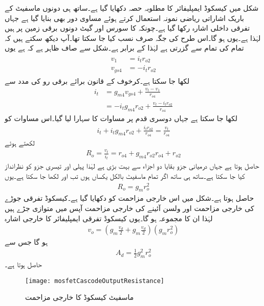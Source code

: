 شکل  میں کیسکوڈ ایمپلیفائر کا مطلوبہ حصہ دکھایا گیا ہے۔ساتھ ہی دونوں ماسفیٹ کے باریک اشاراتی ریاضی نمونہ استعمال کرتے ہوئے مساوی دور بھی بنایا گیا ہے جہاں تفرقی داخلی اشارہ  رکھا گیا ہے۔چونکہ  کا سورس اور گیٹ دونوں برقی زمین پر ہیں لہٰذا  ہے۔یوں  ہو گا۔اس طرح  کی جگہ صرف  نسب کیا جا سکتا تھا۔آپ دیکھ سکتے ہیں کہ  تمام کی تمام  سے گزرتی ہے لہٰذا  کے برابر ہے۔شکل سے صاف ظاہر ہے کہ  ہے یوں
\begin{gather}
\begin{aligned}\label{مساوات_تفرقی_ماسفیٹ_کیسکوڈ_خارجی_مزاحمت}
v_1&=i_t r_{o2}\\
v_{gs4}&=-i_t r_{o2}
\end{aligned}
\end{gather}
لکھا جا سکتا ہے۔کرخوف کے قانون برائے برقی رو کی مدد سے
\begin{align*}
i_t&=g_{m4} v_{gs4}+\frac{v_t-v_1}{r_{o4}}\\
&=-i_t g_{m4} r_{o2}+\frac{v_t-i_t r_{o2}}{r_{o4}}
\end{align*}
لکھا جا سکتا ہے جہاں دوسری قدم پر مساوات  کا سہارا لیا گیا۔اس مساوات کو
\begin{align*}
i_t+i_t g_{m4} r_{o2}+\frac{i_t r_{o2}}{r_{o4}}=\frac{v_t}{r_{o4}}
\end{align*}
لکھتے ہوئے
\begin{align}
R_o=\frac{v_t}{i_t}=r_{o4}+g_{m4} r_{o2} r_{o4}+r_{o2}
\end{align}
حاصل ہوتا ہے جہاں درمیانی جزو بقایا دو اجزاء سے بہت بڑی ہے لہٰذا پہلی اور تیسری جزو کو نظرانداز کیا جا سکتا ہے۔ساتھ ہی ساتھ اگر تمام ماسفیٹ بالکل یکساں ہوں تب  اور  لکھا جا سکتا ہے۔یوں
\begin{align}
R_o=g_{m} r_o^2
\end{align}
حاصل ہوتا ہے۔شکل  میں اس خارجی مزاحمت کو دکھایا گیا ہے۔کیسکوڈ تفرقی جوڑے کی خارجی مزاحمت اور ولسن آئینے کی خارجی مزاحمت آپس میں متوازی جڑے ہیں لہٰذا ان کا مجموعہ  ہو گا۔یوں کیسکوڈ  تفرقی ایمپلیفائر کا خارجی اشارہ
\begin{align*}
v_o =\left(g_m \frac{v_d}{2}+ g_m \frac{v_d}{2}\right) \left(g_m r_o^2 \right)
\end{align*} 
ہو گا جس سے
\begin{align}
A_d=\frac{1}{2} g_m^2 r_o^2
\end{align}
حاصل ہوتا ہے۔
\begin{figure}
\centering
\texttt{[image: mosfetCascodeOutputResistance]}
\caption{ماسفیٹ کیسکوڈ  کا خارجی مزاحمت}
\label{شکل_تفرقی_ماسفیٹ_کیسکوڈ_مزاحمت}
\end{figure}


